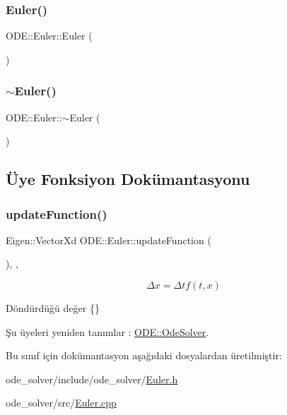 \subsubsection{\texorpdfstring{Euler()}{Euler()}}
{\footnotesize\ttfamily O\+D\+E\+::\+Euler\+::\+Euler (\begin{DoxyParamCaption}{ }\end{DoxyParamCaption})}

\mbox{\label{classODE_1_1Euler_ae2e069205ac7b0fe678e67a100954167}} 
\subsubsection{\texorpdfstring{$\sim$Euler()}{~Euler()}}
{\footnotesize\ttfamily O\+D\+E\+::\+Euler\+::$\sim$\+Euler (\begin{DoxyParamCaption}{ }\end{DoxyParamCaption})\hspace{0.3cm}{\ttfamily [virtual]}}



\subsection{Üye Fonksiyon Dokümantasyonu}
\mbox{\label{classODE_1_1Euler_a8d8ea2d464ecbbcc7258eaf660f57903}} 
\subsubsection{\texorpdfstring{updateFunction()}{updateFunction()}}
{\footnotesize\ttfamily Eigen\+::\+Vector\+Xd O\+D\+E\+::\+Euler\+::update\+Function (\begin{DoxyParamCaption}{ }\end{DoxyParamCaption})\hspace{0.3cm}{\ttfamily [override]}, {\ttfamily [protected]}, {\ttfamily [virtual]}}

\[ \Delta x = \Delta t f(t,x) \] \begin{DoxyReturn}{Döndürdüğü değer}
\{\} 
\end{DoxyReturn}


Şu üyeleri yeniden tanımlar \+: \mbox{\hyperlink{classODE_1_1OdeSolver_a000187013258d0b43ffd8a14486e7ab8}{O\+D\+E\+::\+Ode\+Solver}}.



Bu sınıf için dokümantasyon aşağıdaki dosyalardan üretilmiştir\+:\begin{DoxyCompactItemize}
\item 
ode\+\_\+solver/include/ode\+\_\+solver/\mbox{\hyperlink{Euler_8h}{Euler.\+h}}\item 
ode\+\_\+solver/src/\mbox{\hyperlink{Euler_8cpp}{Euler.\+cpp}}\end{DoxyCompactItemize}
